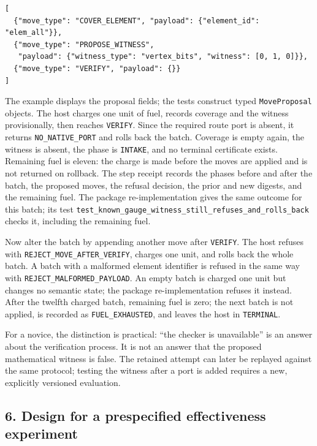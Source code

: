 \documentclass[
  11pt,
]{article}
\newcommand{\passthrough}[1]{#1}
\begin{document}
\begin{lstlisting}
[
  {"move_type": "COVER_ELEMENT", "payload": {"element_id": "elem_all"}},
  {"move_type": "PROPOSE_WITNESS",
   "payload": {"witness_type": "vertex_bits", "witness": [0, 1, 0]}},
  {"move_type": "VERIFY", "payload": {}}
]
\end{lstlisting}

The example displays the proposal fields; the tests construct typed
\passthrough{\lstinline!MoveProposal!} objects. The host charges one
unit of fuel, records coverage and the witness provisionally, then
reaches \passthrough{\lstinline!VERIFY!}. Since the required route port
is absent, it returns \texttt{\nolinkurl{NO_NATIVE_PORT}} and
rolls back the batch. Coverage is empty again, the witness is absent,
the phase is \passthrough{\lstinline!INTAKE!}, and no terminal
certificate exists. Remaining fuel is eleven: the charge is made before
the moves are applied and is not returned on rollback. The step receipt
records the phases before and after the batch, the proposed moves, the
refusal decision, the prior and new digests, and the remaining fuel. The
package re-implementation gives the same outcome for this batch; its
test
\texttt{\nolinkurl{test_known_gauge_witness_still_refuses_and_rolls_back}}
checks it, including the remaining fuel.

Now alter the batch by appending another move after
\passthrough{\lstinline!VERIFY!}. The host refuses with
\texttt{\nolinkurl{REJECT_MOVE_AFTER_VERIFY}}, charges one unit,
and rolls back the whole batch. A batch with a malformed element
identifier is refused in the same way with
\texttt{\nolinkurl{REJECT_MALFORMED_PAYLOAD}}. An empty batch is
charged one unit but changes no semantic state; the package
re-implementation refuses it instead. After the twelfth charged batch,
remaining fuel is zero; the next batch is not applied, is recorded as
\texttt{\nolinkurl{FUEL_EXHAUSTED}}, and leaves the host in
\passthrough{\lstinline!TERMINAL!}.

For a novice, the distinction is practical: ``the checker is
unavailable'' is an answer about the verification process. It is not an
answer that the proposed mathematical witness is false. The retained
attempt can later be replayed against the same protocol; testing the
witness after a port is added requires a new, explicitly versioned
evaluation.

\hypertarget{design-for-a-prespecified-effectiveness-experiment}{%
\subsection{6. Design for a prespecified effectiveness
experiment}\label{design-for-a-prespecified-effectiveness-experiment}}
\end{document}
